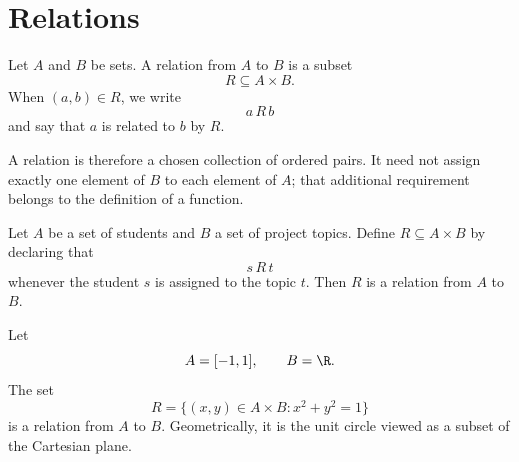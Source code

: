 \section{Relations}
\label{subsec:relations}

\begin{definition}
Let \(A\) and \(B\) be sets. A relation from \(A\) to \(B\) is a subset
\[
  R\subseteq A\times B.
\]
When \((a,b)\in R\), we write
\[
  a\,R\,b
\]
and say that \(a\) is related to \(b\) by \(R\).
\end{definition}

A relation is therefore a chosen collection of ordered pairs. It need
not assign exactly one element of \(B\) to each element of \(A\); that
additional requirement belongs to the definition of a function.

\begin{example}
Let \(A\) be a set of students and \(B\) a set of project topics. Define
\(R\subseteq A\times B\) by declaring that
\[
  s\,R\,t
\]
whenever the student \(s\) is assigned to the topic \(t\). Then \(R\)
is a relation from \(A\) to \(B\).
\end{example}

\begin{example}
Let
\[
  A=[-1,1],
  \qquad
  B=\R.
\]
The set
\[
  R
  =
  \{(x,y)\in A\times B:x^2+y^2=1\}
\]
is a relation from $A$ to $B$. Geometrically, it is the unit circle
viewed as a subset of the Cartesian plane.
\end{example}



